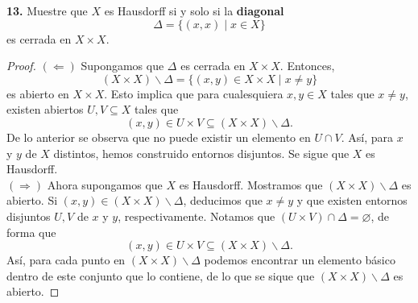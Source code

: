 \documentclass{article}
\begin{document}
\begin{mybox}
	\textbf{13. } Muestre que $X$ es Hausdorff si y solo si la \textbf{diagonal}
	$$ \Delta = \{ (x, x) \mid x \in X \} $$
	es cerrada en $ X \times X$.
\end{mybox}	
\begin{proof}
	$(\Leftarrow)$ Supongamos que $\Delta$ es cerrada en $X \times X$. Entonces, 
	$$ \left( X \times X \right)  \backslash \Delta = \{ (x, y) \in X \times X \mid x \neq y \}$$ 
es abierto en $X \times X$. Esto implica que para cualesquiera $x, y \in X$ tales que $x \neq y$, existen abiertos $U, V \subseteq X$ tales que
$$ (x, y) \in U \times V \subseteq  \left( X \times X \right)  \backslash \Delta. $$
De lo anterior se observa que no puede existir un elemento en $U \cap V$. Así, para $x$ y $y$ de $X$ distintos, hemos construido entornos disjuntos. Se sigue que $X$ es Hausdorff.\\
$(\Rightarrow)$ Ahora supongamos que $X$ es Hausdorff. Mostramos que $\left( X \times X \right)  \backslash \Delta$ es abierto. Si $(x, y) \in \left( X \times X \right)  \backslash \Delta$, deducimos que $x \neq y$ y que existen entornos disjuntos $U, V$ de $x$ y $y$, respectivamente. Notamos que $ (U \times V) \cap \Delta = \varnothing$, de forma que 
$$(x, y) \in U \times V \subseteq \left( X \times X \right)  \backslash \Delta.$$ 
Así, para cada punto en $\left( X \times X \right)  \backslash \Delta$ podemos encontrar un elemento básico dentro de este conjunto que lo contiene, de lo que se sique que $\left( X \times X \right)  \backslash \Delta$ es abierto. 
\end{proof}
\end{document}
